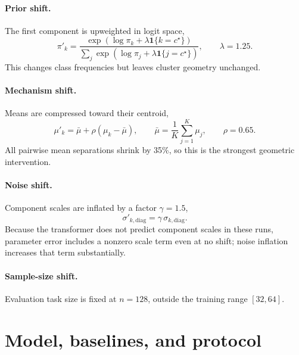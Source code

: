 \documentclass{article}
\begin{document}
\paragraph{Prior shift.}
The first component is upweighted in logit space,
\begin{equation}
\pi'_k = \frac{\exp\!\left(\log \pi_k + \lambda \mathbf{1}\{k=c^\star\}\right)}{\sum_j \exp\!\left(\log \pi_j + \lambda \mathbf{1}\{j=c^\star\}\right)},
\qquad \lambda = 1.25.
\end{equation}
This changes class frequencies but leaves cluster geometry unchanged.

\paragraph{Mechanism shift.}
Means are compressed toward their centroid,
\begin{equation}
\mu'_k = \bar{\mu} + \rho (\mu_k - \bar{\mu}),
\qquad
\bar{\mu} = \frac{1}{K} \sum_{j=1}^K \mu_j,
\qquad \rho = 0.65.
\end{equation}
All pairwise mean separations shrink by 35\%, so this is the strongest geometric intervention.

\paragraph{Noise shift.}
Component scales are inflated by a factor $\gamma = 1.5$,
\begin{equation}
\sigma'_{k,\mathrm{diag}} = \gamma \, \sigma_{k,\mathrm{diag}}.
\end{equation}
Because the transformer does not predict component scales in these runs, parameter error includes a nonzero scale term even at no shift; noise inflation increases that term substantially.

\paragraph{Sample-size shift.}
Evaluation task size is fixed at $n=128$, outside the training range $[32,64]$.

\section{Model, baselines, and protocol}
\end{document}
